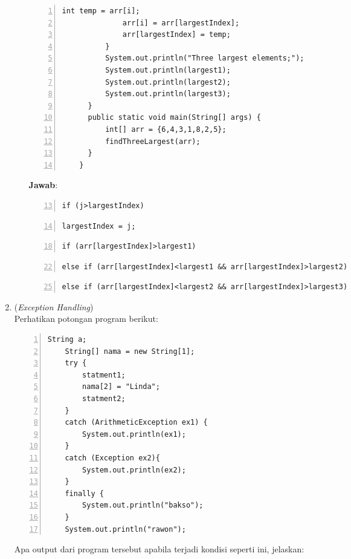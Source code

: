 \documentclass{article}
\newcommand{\jawab}{\textbf{Jawab}:}
\begin{document}
\begin{enumerate}
\begin{enumerate}
\begin{lstlisting}[numbers=left,frame=single,numbersep= -8pt]
              int temp = arr[i];
              arr[i] = arr[largestIndex];
              arr[largestIndex] = temp;
          }
          System.out.println("Three largest elements;");
          System.out.println(largest1);
          System.out.println(largest2);
          System.out.println(largest3);
      }
      public static void main(String[] args) {
          int[] arr = {6,4,3,1,8,2,5};
          findThreeLargest(arr);
      }
    }
      \end{lstlisting}
      \jawab
      \begin{lstlisting}[numbers=left,frame=single,numbersep= -8pt,firstnumber = 13]
      if (j>largestIndex)
        \end{lstlisting}
        \begin{lstlisting}[numbers=left,frame=single,numbersep= -8pt,firstnumber = 14]
      largestIndex = j;
        \end{lstlisting}
        \begin{lstlisting}[numbers=left,frame=single,numbersep= -8pt,firstnumber = 18]
      if (arr[largestIndex]>largest1)
        \end{lstlisting}
        \begin{lstlisting}[numbers=left,frame=single,numbersep= -8pt,firstnumber = 22]
      else if (arr[largestIndex]<largest1 && arr[largestIndex]>largest2)
        \end{lstlisting}
        \begin{lstlisting}[numbers=left,frame=single,numbersep= -8pt,firstnumber = 25]
      else if (arr[largestIndex]<largest2 && arr[largestIndex]>largest3)
        \end{lstlisting}
    \end{enumerate}
    \item (\textit{Exception Handling})\\
    Perhatikan potongan program berikut:
    \begin{lstlisting}[numbers=left,frame=single,numbersep= -8pt]
    String a;
    String[] nama = new String[1];
    try {
        statment1;
        nama[2] = "Linda";
        statment2;
    } 
    catch (ArithmeticException ex1) {
        System.out.println(ex1);
    } 
    catch (Exception ex2){
        System.out.println(ex2);
    }
    finally {
        System.out.println("bakso");
    }
    System.out.println("rawon");
    \end{lstlisting}
    Apa output dari program tersebut apabila terjadi kondisi seperti ini, jelaskan:
    \begin{enumerate}[label=\alph*.]

\end{enumerate}
\end{enumerate}
\end{document}
